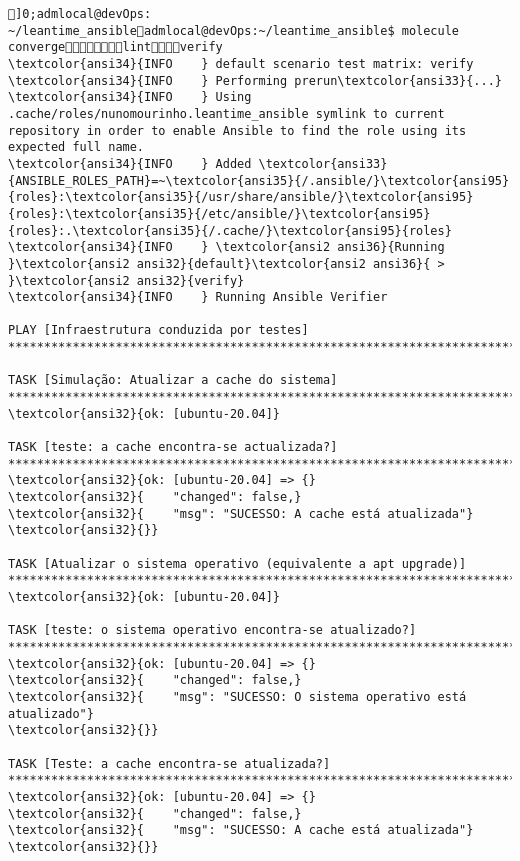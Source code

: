\documentclass{scrartcl}
\begin{document}
\begin{Verbatim}
]0;admlocal@devOps: ~/leantime_ansibleadmlocal@devOps:~/leantime_ansible$ molecule convergelintverify
\textcolor{ansi34}{INFO    } default scenario test matrix: verify
\textcolor{ansi34}{INFO    } Performing prerun\textcolor{ansi33}{...}
\textcolor{ansi34}{INFO    } Using .cache/roles/nunomourinho.leantime_ansible symlink to current repository in order to enable Ansible to find the role using its expected full name.
\textcolor{ansi34}{INFO    } Added \textcolor{ansi33}{ANSIBLE_ROLES_PATH}=~\textcolor{ansi35}{/.ansible/}\textcolor{ansi95}{roles}:\textcolor{ansi35}{/usr/share/ansible/}\textcolor{ansi95}{roles}:\textcolor{ansi35}{/etc/ansible/}\textcolor{ansi95}{roles}:.\textcolor{ansi35}{/.cache/}\textcolor{ansi95}{roles}
\textcolor{ansi34}{INFO    } \textcolor{ansi2 ansi36}{Running }\textcolor{ansi2 ansi32}{default}\textcolor{ansi2 ansi36}{ > }\textcolor{ansi2 ansi32}{verify}
\textcolor{ansi34}{INFO    } Running Ansible Verifier

PLAY [Infraestrutura conduzida por testes] ***********************************************************************************************

TASK [Simulação: Atualizar a cache do sistema] *******************************************************************************************
\textcolor{ansi32}{ok: [ubuntu-20.04]}

TASK [teste: a cache encontra-se actualizada?] *******************************************************************************************
\textcolor{ansi32}{ok: [ubuntu-20.04] => {}
\textcolor{ansi32}{    "changed": false,}
\textcolor{ansi32}{    "msg": "SUCESSO: A cache está atualizada"}
\textcolor{ansi32}{}}

TASK [Atualizar o sistema operativo (equivalente a apt upgrade)] *************************************************************************
\textcolor{ansi32}{ok: [ubuntu-20.04]}

TASK [teste: o sistema operativo encontra-se atualizado?] ********************************************************************************
\textcolor{ansi32}{ok: [ubuntu-20.04] => {}
\textcolor{ansi32}{    "changed": false,}
\textcolor{ansi32}{    "msg": "SUCESSO: O sistema operativo está atualizado"}
\textcolor{ansi32}{}}

TASK [Teste: a cache encontra-se atualizada?] ********************************************************************************************
\textcolor{ansi32}{ok: [ubuntu-20.04] => {}
\textcolor{ansi32}{    "changed": false,}
\textcolor{ansi32}{    "msg": "SUCESSO: A cache está atualizada"}
\textcolor{ansi32}{}}


\end{Verbatim}
\end{document}

